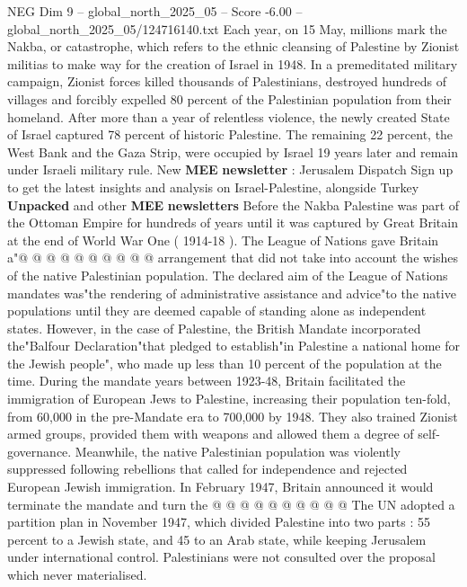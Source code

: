 \begin{textsample}{NEG Dim 9 – global\_north\_2025\_05 – Score -6.00 – global\_north\_2025\_05/124716140.txt}  \label{ex:f9_neg_088}
Each year, on 15 May, millions mark the Nakba, or catastrophe, which refers to the ethnic cleansing of Palestine by Zionist militias to make way for the creation of Israel in 1948.
In a premeditated military campaign, Zionist forces killed thousands of Palestinians, destroyed hundreds of villages and forcibly expelled 80 percent of the Palestinian population from their homeland.
After more than a year of relentless violence, the newly created State of Israel captured 78 percent of historic Palestine.
The remaining 22 percent, the West Bank and the Gaza Strip, were occupied by Israel 19 years later and remain under Israeli military rule.
New \textbf{MEE} \textbf{newsletter} : Jerusalem Dispatch Sign up to get the latest insights and analysis on Israel-Palestine, alongside Turkey \textbf{Unpacked} and other \textbf{MEE} \textbf{newsletters} Before the Nakba Palestine was part of the Ottoman Empire for hundreds of years until it was captured by Great Britain at the end of World War One ( 1914-18 ).
The League of Nations gave Britain a"@ @ @ @ @ @ @ @ @ @ arrangement that did not take into account the wishes of the native Palestinian population.
The declared aim of the League of Nations mandates was"the rendering of administrative assistance and advice"to the native populations until they are deemed capable of standing alone as independent states.
However, in the case of Palestine, the British Mandate incorporated the"Balfour Declaration"that pledged to establish"in Palestine a national home for the Jewish people", who made up less than 10 percent of the population at the time.
During the mandate years between 1923-48, Britain facilitated the immigration of European Jews to Palestine, increasing their population ten-fold, from 60,000 in the pre-Mandate era to 700,000 by 1948.
They also trained Zionist armed groups, provided them with weapons and allowed them a degree of self-governance.
Meanwhile, the native Palestinian population was violently suppressed following rebellions that called for independence and rejected European Jewish immigration.
In February 1947, Britain announced it would terminate the mandate and turn the @ @ @ @ @ @ @ @ @ @ The UN adopted a partition plan in November 1947, which divided Palestine into two parts : 55 percent to a Jewish state, and 45 to an Arab state, while keeping Jerusalem under international control.
Palestinians were not consulted over the proposal which never materialised.

\end{textsample}
